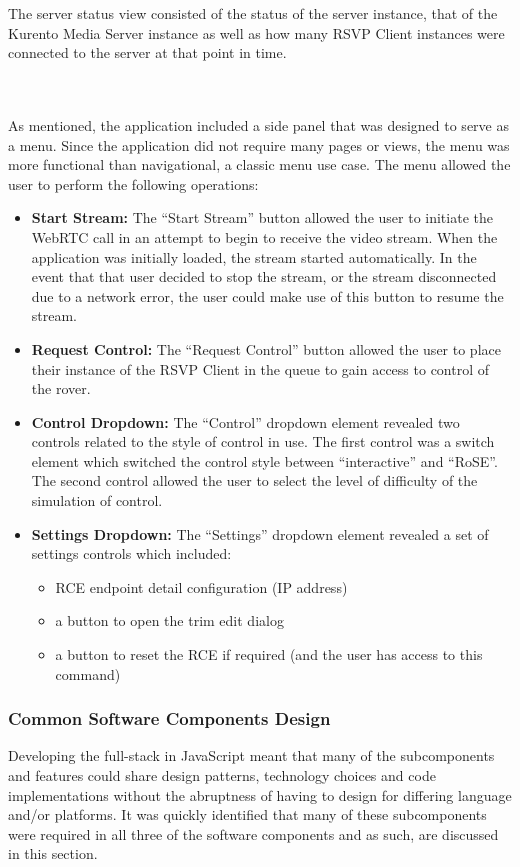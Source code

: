         The server status view consisted of the status of the server instance, that of the Kurento Media Server instance as well as how many RSVP Client instances were connected to the server at that point in time.
        
      \\\\
        As mentioned, the application included a side panel that was designed to serve as a menu. Since the application did not require many pages or views, the menu was more functional than navigational, a classic menu use case. The menu allowed the user to perform the following operations:
        
        \begin{itemize}
          \item \textbf{Start Stream:} The ``Start Stream'' button allowed the user to initiate the WebRTC call in an attempt to begin to receive the video stream. When the application was initially loaded, the stream started automatically. In the event that that user decided to stop the stream, or the stream disconnected due to a network error, the user could make use of this button to resume the stream.
          \item \textbf{Request Control:} The ``Request Control'' button allowed the user to place their instance of the RSVP Client in the queue to gain access to control of the rover.
          \item \textbf{Control Dropdown:} The ``Control'' dropdown element revealed two controls related to the style of control in use. The first control was a switch element which switched the control style between ``interactive'' and ``RoSE''. The second control allowed the user to select the level of difficulty of the simulation of control.
          \item \textbf{Settings Dropdown:} The ``Settings'' dropdown element revealed a set of settings controls which included:
          \begin{itemize}
            \item RCE endpoint detail configuration (IP address)
            \item a button to open the trim edit dialog
            \item a button to reset the RCE if required (and the user has access to this command)
          \end{itemize}
        \end{itemize}
      
    \subsubsection{Common Software Components Design}
    \label{subsec:commonSoftwareComponentDesign}
      Developing the full-stack in JavaScript meant that many of the subcomponents and features could share design patterns, technology choices and code implementations without the abruptness of having to design for differing language and/or platforms. It was quickly identified that many of these subcomponents were required in all three of the software components and as such, are discussed in this section.
      
